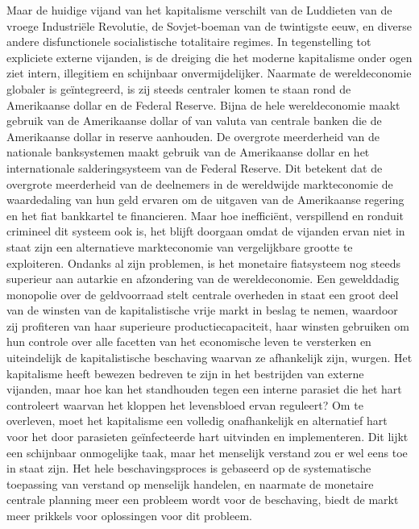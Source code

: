 Maar de huidige vijand van het kapitalisme verschilt van de Luddieten van de vroege Industriële Revolutie, de Sovjet-boeman van de twintigste eeuw, en diverse andere disfunctionele socialistische totalitaire regimes. In tegenstelling tot expliciete externe vijanden, is de dreiging die het moderne kapitalisme onder ogen ziet intern, illegitiem en schijnbaar onvermijdelijker. Naarmate de wereldeconomie globaler is geïntegreerd, is zij steeds centraler komen te staan rond de Amerikaanse dollar en de Federal Reserve. Bijna de hele wereldeconomie maakt gebruik van de Amerikaanse dollar of van valuta van centrale banken die de Amerikaanse dollar in reserve aanhouden. De overgrote meerderheid van de nationale banksystemen maakt gebruik van de Amerikaanse dollar en het internationale salderingsysteem van de Federal Reserve. Dit betekent dat de overgrote meerderheid van de deelnemers in de wereldwijde markteconomie de waardedaling van hun geld ervaren om de uitgaven van de Amerikaanse regering en het fiat bankkartel te financieren. Maar hoe inefficiënt, verspillend en ronduit crimineel dit systeem ook is, het blijft doorgaan omdat de vijanden ervan niet in staat zijn een alternatieve markteconomie van vergelijkbare grootte te exploiteren. Ondanks al zijn problemen, is het monetaire fiatsysteem nog steeds superieur aan autarkie en afzondering van de wereldeconomie. Een gewelddadig monopolie over de geldvoorraad stelt centrale overheden in staat een groot deel van de winsten van de kapitalistische vrije markt in beslag te nemen, waardoor zij profiteren van haar superieure productiecapaciteit, haar winsten gebruiken om hun controle over alle facetten van het economische leven te versterken en uiteindelijk de kapitalistische beschaving waarvan ze afhankelijk zijn, wurgen. Het kapitalisme heeft bewezen bedreven te zijn in het bestrijden van externe vijanden, maar hoe kan het standhouden tegen een interne parasiet die het hart controleert waarvan het kloppen het levensbloed ervan reguleert? Om te overleven, moet het kapitalisme een volledig onafhankelijk en alternatief hart voor het door parasieten geïnfecteerde hart uitvinden en implementeren. Dit lijkt een schijnbaar onmogelijke taak, maar het menselijk verstand zou er wel eens toe in staat zijn. Het hele beschavingsproces is gebaseerd op de systematische toepassing van verstand op menselijk handelen, en naarmate de monetaire centrale planning meer een probleem wordt voor de beschaving, biedt de markt meer prikkels voor oplossingen voor dit probleem.

